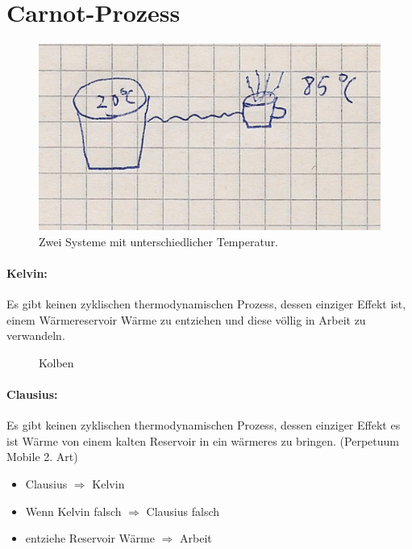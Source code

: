 \section{Carnot-Prozess}
\begin{figure}[H]
  \centering
  \includegraphics[width = \textwidth]{Zeichnungen/18.pdf}
  \caption{Zwei Systeme mit unterschiedlicher Temperatur.}
\end{figure}
\paragraph{Kelvin:} Es gibt keinen zyklischen thermodynamischen Prozess, dessen einziger Effekt ist, einem Wärmereservoir Wärme zu entziehen  und diese völlig in Arbeit zu verwandeln.

\begin{figure}
\centering
{}
\caption{Kolben}
\end{figure}
\paragraph{Clausius:} Es gibt keinen zyklischen thermodynamischen Prozess, dessen einziger Effekt es ist Wärme von einem kalten Reservoir in ein wärmeres zu bringen. (Perpetuum Mobile 2. Art)  
\begin{itemize}
    \item Clausius $\Rightarrow$ Kelvin
    \item Wenn Kelvin falsch $\Rightarrow$ Clausius falsch
    \item entziehe Reservoir Wärme $\Rightarrow$ Arbeit
    
\end{itemize}
